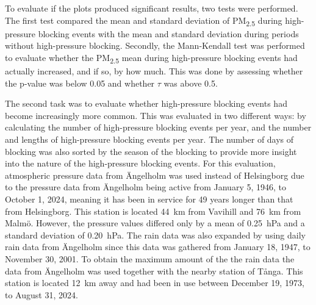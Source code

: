 To evaluate if the plots produced significant results, two tests were performed. The first test compared the mean and standard deviation of PM\textsubscript{2.5} during high-pressure blocking events with the mean and standard deviation during periods without high-pressure blocking. Secondly, the Mann-Kendall test was performed to evaluate whether the PM\textsubscript{2.5} mean during high-pressure blocking events had actually increased, and if so, by how much. This was done by assessing whether the p-value was below 0.05 and whether $\tau$ was above 0.5.

The second task was to evaluate whether high-pressure blocking events had become increasingly more common. This was evaluated in two different ways: by calculating the number of high-pressure blocking events per year, and the number and lengths of high-pressure blocking events per year. The number of days of blocking was also sorted by the season of the blocking to provide more insight into the nature of the high-pressure blocking events. For this evaluation, atmospheric pressure data from Ängelholm was used instead of Helsingborg due to the pressure data from Ängelholm being active from January 5, 1946, to October 1, 2024, meaning it has been in service for 49 years longer than that from Helsingborg. This station is located \SI{44}{\km} from Vavihill and \SI{76}{\km} from Malmö. However, the pressure values differed only by a mean of \SI{0.25}{\hecto\pascal} and a standard deviation of \SI{0.20}{\hecto\pascal}. The rain data was also expanded by using daily rain data from Ängelholm since this data was gathered from January 18, 1947, to November 30, 2001. To obtain the maximum amount of the the rain data the data from Ängelholm was used together with the nearby station of Tånga. This station is located \SI{12}{\km} away and had been in use between December 19, 1973, to August 31, 2024. 


